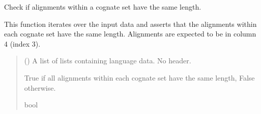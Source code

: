 \documentclass[letterpaper,10pt,english]{sphinxmanual}
\begin{document}
\begin{fulllineitems}
\begin{sphinxVerbatim}[commandchars=\\\{\}]
\PYG{p}{]}
 
\end{sphinxVerbatim}

\end{fulllineitems}


\begin{fulllineitems}
\label{\detokenize{documentation:loanpy.utils.is_same_length_alignments}}
\pysigstartsignatures
{}
\pysigstopsignatures
\sphinxAtStartPar
Check if alignments within a cognate set have the same length.

\sphinxAtStartPar
This function iterates over the input data and asserts that the alignments
within each cognate set have the same length. Alignments are expected to be in
column 4 (index 3).
\begin{quote}\begin{description}
\sphinxAtStartPar
{} () \textendash{} A list of lists containing language data. No header.

\sphinxAtStartPar
True if all alignments within each cognate set have the same length,
False otherwise.

\sphinxAtStartPar
bool

\end{description}\end{quote}

\sphinxAtStartPar
{}


\end{fulllineitems}
\end{document}
